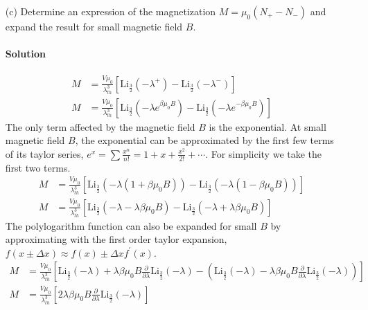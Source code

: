 \documentclass{article}
\begin{document}
\begin{enumerate}
		\item[(c)] Determine an expression of the magnetization $M=\mu_0 (N_+ - N_-)$ and expand the result for small magnetic field $B$.
		\paragraph{Solution}
		\begin{align}
			M &= \frac{V\mu_0}{\lambda^3_{th}} \left[ \mathrm{Li}_{\frac{3}{2}}(-\lambda^+) - \mathrm{Li}_{\frac{3}{2}}(-\lambda^-) \right] \\
			M &= \frac{V\mu_0}{\lambda^3_{th}} \left[ \mathrm{Li}_{\frac{3}{2}}(-\lambda e^{\beta \mu_0 B}) - \mathrm{Li}_{\frac{3}{2}}(-\lambda e^{-\beta \mu_0 B}) \right]
		\end{align}
		The only term affected by the magnetic field $B$ is the exponential. At small magnetic field $B$, the exponential can be approximated by the first few terms of its taylor series, $e^x = \sum \frac{x^n}{n!} = 1 + x + \frac{x^2}{2!} + \cdots$. For simplicity we take the first two terms.
		\begin{align}
			M &= \frac{V\mu_0}{\lambda^3_{th}} \left[ \mathrm{Li}_{\frac{3}{2}}(-\lambda (1 + \beta \mu_0 B)) - \mathrm{Li}_{\frac{3}{2}}(-\lambda (1 - \beta \mu_0 B)) \right] \\
			M &= \frac{V\mu_0}{\lambda^3_{th}} \left[ \mathrm{Li}_{\frac{3}{2}}( -\lambda -\lambda\beta \mu_0 B) - \mathrm{Li}_{\frac{3}{2}}(-\lambda + \lambda\beta \mu_0 B) \right]
		\end{align}
		The polylogarithm function can also be expanded for small $B$ by approximating with the first order taylor expansion, $f(x\pm \Delta x) \approx f(x) \pm \Delta x f^\prime(x)$.
		\begin{align}
			M &= \frac{V\mu_0}{\lambda^3_{th}} \left[ \mathrm{Li}_{\frac{3}{2}}(-\lambda) + \lambda\beta \mu_0 B \frac{\partial}{\partial\lambda} \mathrm{Li}_{\frac{3}{2}}(-\lambda) - \left( \mathrm{Li}_{\frac{3}{2}}(-\lambda) - \lambda\beta \mu_0 B \frac{\partial}{\partial\lambda} \mathrm{Li}_{\frac{3}{2}}(-\lambda) \right) \right] \\
			M &= \frac{V\mu_0}{\lambda^3_{th}} \left[ 2  \lambda\beta \mu_0 B \frac{\partial}{\partial\lambda} \mathrm{Li}_{\frac{3}{2}}(-\lambda) \right]

\end{align}
\end{enumerate}
\end{document}
